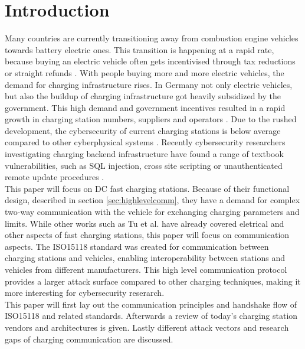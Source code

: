 \documentclass[conference,flushend]{iaria} %
\begin{document}
\section{Introduction}
Many countries are currently transitioning away from combustion engine vehicles towards battery electric ones.
This transition is happening at a rapid rate, because buying an electric vehicle often gets incentivised through tax reductions or straight refunds \cite{kraftfahrtbundesamt_anzahl_2024}.
With people buying more and more electric vehicles, the demand for charging infrastructure rises.
In Germany not only electric vehicles, but also the buildup of charging infrastructure got heavily subsidized by the government.
This high demand and government incentives resulted in a rapid growth in charging station numbers, suppliers and operators \cite{bundesnetzagentur_anzahl_2024}.
Due to the rushed development, the cybersecurity of current charging stations is below average compared to other cyberphysical systems \cite{nasr_power_2022, johnson_review_2022, ahalawat_security_2022}.
Recently cybersecurity researchers investigating charging backend infrastructure have found a range of textbook vulnerabilities, such as SQL injection, cross site scripting or unauthenticated remote update procedures \cite{nasr_power_2022}.
\\
This paper will focus on DC fast charging stations. Because of their functional design, described in section \ref{sec:highlevelcomm}, they have a demand for complex two-way communication with the vehicle for exchanging charging parameters and limits.
While other works such as Tu et al. \cite{tu_extreme_2019} have already covered eletrical and other aspects of fast charging stations, this paper will focus on communication aspects.
The ISO15118 standard was created for communication between charging stations and vehicles, enabling interoperability between stations and vehicles from different manufacturers.
This high level communication protocol provides a larger attack surface compared to other charging techniques, making it more interesting for cybersecurity reserarch. \\
This paper will first lay out the communication principles and handshake flow of ISO15118 and related standards.
Afterwards a review of today's charging station vendors and architectures is given.
Lastly different attack vectors and research gaps of charging communication are discussed.
\end{document}
